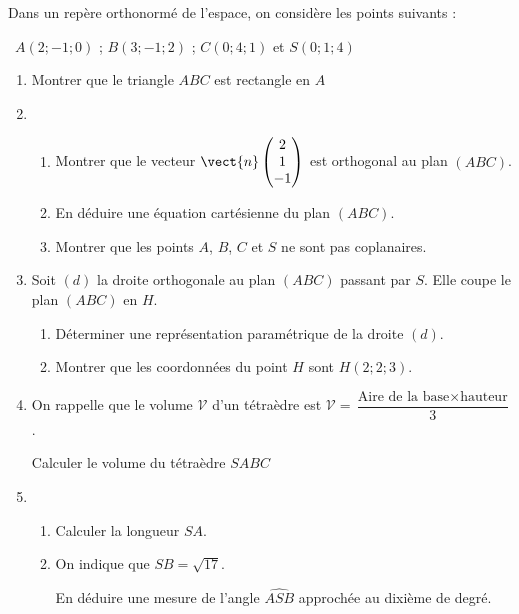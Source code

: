 Dans un repère orthonormé de l’espace, on considère les points suivants :

\hfill~$A(2;-1;0)$ ; $B(3;-1;2)$ ; $C(0;4;1)$ et $S(0;1;4)$\hfill~

\begin{enumerate}
	\item Montrer que le triangle $ABC$ est rectangle en $A$
	\item 
	\begin{enumerate}
		\item Montrer que le vecteur $\vect{n} \begin{pmatrix}2\\1\\-1\end{pmatrix}$ est orthogonal au plan $(ABC)$.
		\item En déduire une équation cartésienne du plan $(ABC)$.
		\item Montrer que les points $A$, $B$, $C$ et $S$ ne sont pas coplanaires.
	\end{enumerate}
	\item  Soit $(d)$ la droite orthogonale au plan $(ABC)$ passant par $S$. Elle coupe le plan
	$(ABC)$ en $H$.
	\begin{enumerate}
		\item Déterminer une représentation paramétrique de la droite $(d)$.
		\item Montrer que les coordonnées du point $H$ sont $H(2;2;3)$.
	\end{enumerate}
	\item On rappelle que le volume $\mathcal{V}$ d’un tétraèdre est $\mathcal{V} = \dfrac{\text{Aire de la base} \times \text{hauteur}}{3}$.
	
	Calculer le volume du tétraèdre $SABC$
	\item 
	\begin{enumerate}
		\item Calculer la longueur $SA$.
		\item On indique que $SB = \sqrt{17}$.
		
		En déduire une mesure de l’angle $\widehat{ASB}$ approchée au dixième de degré.
	\end{enumerate}
\end{enumerate}

